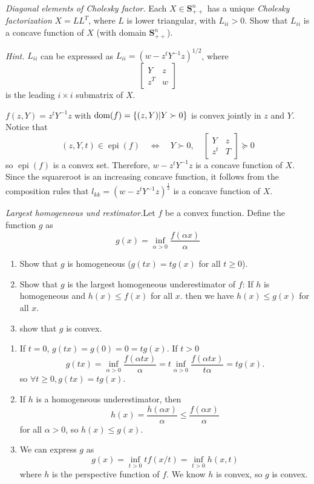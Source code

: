 \begin{problem}[3.27]
    \textit{Diagonal elements of Cholesky factor.} Each $X \in \mathbf{S}^n_{++}$ has a unique \textit{Cholesky factorization} $X = LL^T$, where $L$ is lower triangular, with $L_{ii} > 0$. Show that $L_{ii}$ is a concave function of $X$ (with domain $\mathbf{S}^n_{++}$).

    \textit{Hint.} $L_{ii}$ can be expressed as $L_{ii} = (w - z^tY^{-1}z)^{1 / 2}$, where\[\begin{bmatrix}
        Y & z \\
        z^T & w
    \end{bmatrix}\] is the leading $i \times i$ submatrix of $X$.

    \Answer $f(z, Y) = z^tY^{-1}z$ with $\operatorname{dom}(f) = \left\{(z, Y) | Y \succ 0\right\}$ is convex jointly in $z$ and $Y$. Notice that \[(z, Y, t) \in \operatorname{epi}(f) \quad \Longleftrightarrow \quad Y \succ 0, \quad\begin{bmatrix}
        Y & z \\
        z^t & T
    \end{bmatrix} \succeq 0\] so $\operatorname{epi}(f)$ is a convex set. Therefore, $w - z^tY^{-1}z$ is a concave function of $X$. Since the squareroot is an increasing concave function, it follows from the composition rules that $l_{kk} = (w - z^tY^{-1}z)^{\frac{1}{2}}$ is a concave function of $X$.
\end{problem}


\begin{problem}[3.31]
    \textit{Largest homogeneous und restimator.}Let $f$ be a convex function. Define the function $g$ as 
    \[g(x)=\inf _{\alpha>0} \frac{f(\alpha x)}{\alpha}\]
    \begin{enumerate}
        \item Show that $g$ is homogeneous ($g(tx) = tg(x)$ for all $t \ge 0$).
        \item Show that $g$ is the largest homogeneous underestimator of $f$: If $h$ is homogeneous and $h(x) \le f(x)$ for all $x$. then we have $h(x) \le g(x)$ for all $x$.
        \item show that $g$ is convex.
    \end{enumerate}

    \Answer \text{}\begin{enumerate}
        \item If $t = 0$, $g(tx) = g(0) = 0 = tg(x)$. If $t > 0$ \[g(t x)=\inf _{\alpha>0} \frac{f(\alpha t x)}{\alpha}=t \inf _{\alpha>0} \frac{f(\alpha t x)}{t \alpha}= tg(x) .\] so $\forall t \ge 0, g(tx) = tg(x)$.
        \item If $h$ is a homogeneous underestimator, then \[h(x) = \frac{h(\alpha x)}{\alpha} \le \frac{f(\alpha x)}{\alpha}\] for all $\alpha  > 0$, so $h(x) \le g(x)$.
        \item We can express $g$ as \[g(x) = \inf_{t > 0} tf(x / t) = \inf_{t > 0} h(x, t)\] where $h$ is the perspective function of $f$. We know $h$ is convex, so $g$ is convex.
    \end{enumerate}
\end{problem}


